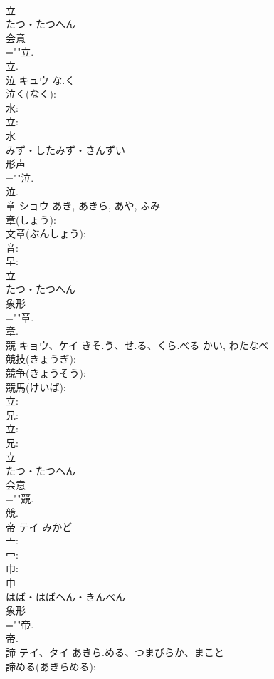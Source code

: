 \documentclass[8pt]{extreport}
\begin{document}
\begin{CJK}{UTF8}{min}
\\	立	
\\	たつ・たつへん	
\\	会意 
\\	=""立.
\\	立.
\\	泣	キュウ	な.く		
\\	泣く(なく): 
\\	水: 
\\	立: 
\\	水	
\\	みず・したみず・さんずい	
\\	形声 
\\	=""泣.
\\	泣.
\\	章	ショウ		あき, あきら, あや, ふみ	
\\	章(しょう): 
\\	文章(ぶんしょう): 
\\	音: 
\\	早: 
\\	立	
\\	たつ・たつへん	
\\	象形 
\\	=""章.
\\	章.
\\	競	キョウ、ケイ	きそ.う、せ.る、くら.べる	かい, わたなべ	
\\	競技(きょうぎ): 
\\	競争(きょうそう): 
\\	競馬(けいば): 
\\	立: 
\\	兄: 
\\	立: 
\\	兄: 
\\	立	
\\	たつ・たつへん	
\\	会意 
\\	=""競.
\\	競.
\\	帝	テイ	みかど		
\\	亠: 
\\	冖: 
\\	巾: 
\\	巾	
\\	はば・はばへん・きんべん	
\\	象形 
\\	=""帝.
\\	帝.
\\	諦	テイ、タイ	あきら.める、つまびらか、まこと		
\\	諦める(あきらめる): 

\end{CJK}
\end{document}
